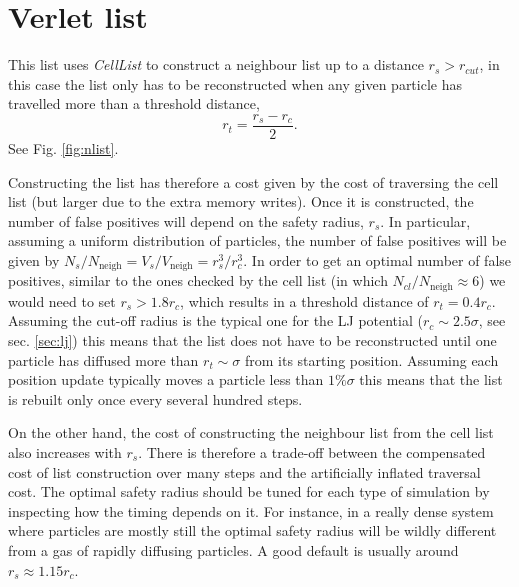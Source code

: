 \documentclass[ twoside,openright,titlepage,numbers=noenddot,%
headinclude,footinclude,cleardoublepage=empty,abstract=on,
BCOR=5mm,paper=b5,fontsize=11pt, dvipsnames
]{scrreprt}
\begin{document}
\section{Verlet list}\label{sec:verletlist}

This list uses \emph{CellList} to construct a neighbour list up to a distance $r_{s} > r_{cut}$, in this case the list only has to be reconstructed when any given particle has travelled more than a threshold distance,
\begin{equation}
r_t = \frac{r_{s}-r_{c}}{2}.
\end{equation}
See Fig. \ref{fig:nlist}.

Constructing the list has therefore a cost given by the cost of traversing the cell list (but larger due to the extra memory writes). Once it is constructed, the number of false positives will depend on the safety radius, $r_s$. In particular, assuming a uniform distribution of particles, the number of false positives will be given by $N_s/N_{\text{neigh}} = V_s/V_{\text{neigh}} = r_s^3/r_c^3$. In order to get an optimal number of false positives, similar to the ones checked by the cell list (in which $N_{cl}/N_{\text{neigh}} \approx 6$) we would need to set $r_s > 1.8r_c$, which results in a threshold distance of $r_t = 0.4r_c$. Assuming the cut-off radius is the typical one for the \gls{LJ} potential ($r_c \sim 2.5\sigma$, see sec. \ref{sec:lj}) this means that the list does not have to be reconstructed until one particle has diffused more than $r_t \sim \sigma$ from its starting position. Assuming each position update typically moves a particle less than $1\%\sigma$ this means that the list is rebuilt only once every several hundred steps.

On the other hand, the cost of constructing the neighbour list from the cell list also increases with $r_s$. There is therefore a trade-off between the compensated cost of list construction over many steps and the artificially inflated traversal cost. The optimal safety radius should be tuned for each type of simulation by inspecting how the timing depends on it. For instance, in a really dense system where particles are mostly still the optimal safety radius will be wildly different from a gas of rapidly diffusing particles. A good default is usually around $r_s\approx 1.15r_c$. 
\end{document}
